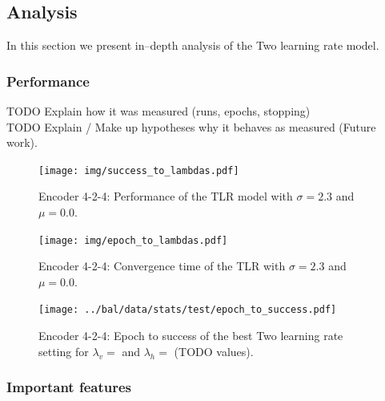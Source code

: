 
\subsection{Analysis} 
In this section we present in--depth analysis of the Two learning rate model.  

\subsubsection{Performance} 

TODO Explain how it was measured (runs, epochs, stopping) \\
TODO Explain / Make up hypotheses why it behaves as measured (Future work). \\

\begin{figure}[t]
  \centering
  \texttt{[image: img/success\_to\_lambdas.pdf]}    
  \caption{Encoder 4-2-4: Performance of the TLR model with $\sigma = 2.3$ and $\mu = 0.0$.}
  \label{fig:results-two-lambdas-auto4-success}
\end{figure}

\begin{figure}[t]
  \centering
  \texttt{[image: img/epoch\_to\_lambdas.pdf]}    
  \caption{Encoder 4-2-4: Convergence time of the TLR with $\sigma = 2.3$ and $\mu = 0.0$.}
  \label{fig:results-two-lambdas-auto4-epoch}
\end{figure}

\begin{figure}[t]
  \centering
  \texttt{[image: ../bal/data/stats/test/epoch\_to\_success.pdf]}    
  \caption{Encoder 4-2-4: Epoch to success of the best Two learning rate setting for $\lambda_v = $ and $\lambda_h=$ (TODO values).}
  \label{fig:results-two-lambdas-auto4-s2e} 
\end{figure}

\subsubsection{Important features}
\label{sec:results-candidates} 

